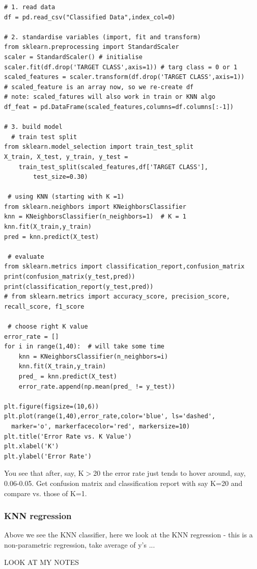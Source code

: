 \documentclass[12pt]{article}
\begin{document}
\begin{lstlisting}
# 1. read data
df = pd.read_csv("Classified Data",index_col=0)

# 2. standardise variables (import, fit and transform)
from sklearn.preprocessing import StandardScaler
scaler = StandardScaler() # initialise
scaler.fit(df.drop('TARGET CLASS',axis=1)) # targ class = 0 or 1
scaled_features = scaler.transform(df.drop('TARGET CLASS',axis=1))
# scaled_feature is an array now, so we re-create df
# note: scaled_fatures will also work in train or KNN algo
df_feat = pd.DataFrame(scaled_features,columns=df.columns[:-1])

# 3. build model
  # train test split
from sklearn.model_selection import train_test_split
X_train, X_test, y_train, y_test = 
	train_test_split(scaled_features,df['TARGET CLASS'],
		test_size=0.30)

 # using KNN (starting with K =1)
from sklearn.neighbors import KNeighborsClassifier
knn = KNeighborsClassifier(n_neighbors=1)  # K = 1
knn.fit(X_train,y_train)
pred = knn.predict(X_test)
 
 # evaluate
from sklearn.metrics import classification_report,confusion_matrix
print(confusion_matrix(y_test,pred))
print(classification_report(y_test,pred))
# from sklearn.metrics import accuracy_score, precision_score, recall_score, f1_score

 # choose right K value
error_rate = []
for i in range(1,40):  # will take some time
	knn = KNeighborsClassifier(n_neighbors=i)
	knn.fit(X_train,y_train)
	pred_ = knn.predict(X_test)
	error_rate.append(np.mean(pred_ != y_test))

plt.figure(figsize=(10,6))
plt.plot(range(1,40),error_rate,color='blue', ls='dashed', 
  marker='o', markerfacecolor='red', markersize=10)
plt.title('Error Rate vs. K Value')
plt.xlabel('K')
plt.ylabel('Error Rate')
\end{lstlisting}
You see that after, say, K$>$20 the error rate just tends to hover around, say, 0.06-0.05. Get confusion matrix and classification report with say K=20 and compare vs. those of K=1.

\subsubsection{KNN regression}
Above we see the KNN classifier, here we look at the KNN regression - this is a non-parametric regression, take average of y's ...

LOOK AT MY NOTES
\end{document}
